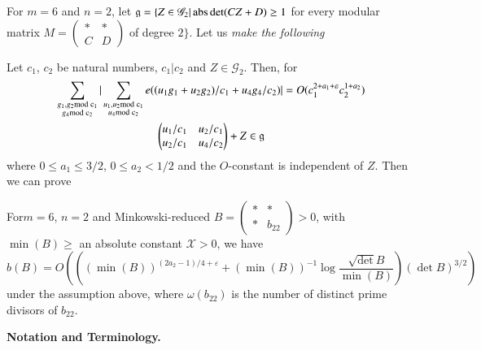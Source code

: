 For $m=6$ and $n=2$, let $\mathfrak{g}=\{Z\in\mathscr{G}_{2}|\operatorname{abs}
\det(CZ+D)\geq 1$ for every modular matrix
$M=\left(\begin{smallmatrix} \ast & \ast\\ C & D
\end{smallmatrix}\right)$ of degree $2\}$. Let us {\em make the
  following}

\medskip
{}
Let $c_{1}$, $c_{2}$ be natural numbers, $c_{1}|c_{2}$ and
$Z\in\mathscr{G}_{2}$. Then, for
\begin{gather*}
\sum\limits_{\substack{g_{1},g_{2}\rm{mod} \; c_{1}\\ g_{4}\rm{mod} \;
    c_{2}}}|\sum\limits_{\substack{u_{1},u_{2}\rm{mod} \; c_{1}\\ u_{4}\rm{mod} \;
    c_{2}}}e((u_{1}g_{1} + u_{2}g_{2})/c_{1} +
u_{4}g_{4}/c_{2})|=O(c^{2+a_{1}+\varepsilon}_{1}c_{2}^{1+a_{2}})\\ 
\begin{pmatrix}
u_{1}/c_{1} & u_{2}/c_{1}\\
u_{2}/c_{1} & u_{4}/c_{2}
\end{pmatrix}
+Z\in \mathfrak{g}
\end{gather*}
where $0\leq a_{1}\leq 3/2$, $0\leq a_{2}<1/2$ and the $O$-constant is
independent of $Z$. Then we can prove 

\begin{alphtheorem}\label{c1:alphthmE}
For\pageoriginale $m=6$, $n=2$ and Minkowski-reduced
$B=\left(\begin{smallmatrix}
\ast & \ast\\ \ast & b_{22}
\end{smallmatrix}\right)>0$, with $\min(B)\geq $ an absolute constant
$\mathscr{X}>0$, we have
$$
b(B)=O(((\min(B))^{(2a_{2}-1)/4+\varepsilon} +
(\min(B))^{-1}\log\frac{\sqrt{\det}B}{\min(B)})(\det 
B)^{3/2}) 
$$
under the assumption above, where $\omega(b_{22})$ is the number of
distinct prime divisors of $b_{22}$.
\end{alphtheorem}

\medskip
\noindent
{\bf Notation and Terminology.}
\smallskip

